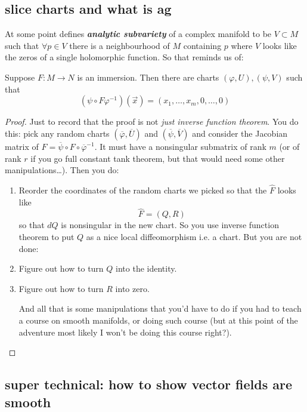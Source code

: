 \subsection{slice charts and what is ag}

At some point \cite{gri} defines \textit{\textbf{analytic subvariety}} of a complex manifold to be \(V \subset M\) such that \(\forall p \in V\) there is a neighbourhood of \(M\) containing \(p\) where \(V\) looks like the zeros of a single holomorphic function. So that reminds us of:

\begin{thm}\leavevmode
Suppose \(F:M \to N\) is an immersion. Then there are charts \((\varphi,U),(\psi,V)\) such that
\[(\psi \circ F \varphi^{-1})(\vec{x})=(x_1,\ldots,x_m,0,\ldots,0)\]
\end{thm}

\begin{proof}\leavevmode
Just to record that the proof is not \textit{just inverse function theorem}. You do this: pick any random charts \((\overline{\varphi},\overline{U})\) and \((\overline{\psi},\overline{V})\) and consider the Jacobian matrix of \(\hat{F}=\overline{\psi}\circ F \circ \overline{\varphi}^{-1}\). It must have a nonsingular submatrix of rank \(m\) (or of rank \(r\) if you go full constant tank theorem, but that would need some other manipulations…). Then you do:
\begin{enumerate}
\item Reorder the coordinates of the random charts we picked so that the \(\hat{F}\) looks like
	\[\hat{F}=(Q,R)\]
	so that \(dQ\) is nonsingular in the new chart. So you use inverse function theorem to put \(Q\) as a nice local diffeomorphism i.e. a chart. But you are not done:
 \item Figure out how to turn \(Q\) into the identity.
\item Figure out how to turn \(R\) into zero.

	And all that is some manipulations that you'd have to do if you had to teach a course on smooth manifolds, or doing such course (but at this point of the adventure most likely I won't be doing this course right?).
\end{enumerate}
\end{proof}

\subsection{super technical: how to show vector fields are smooth}

